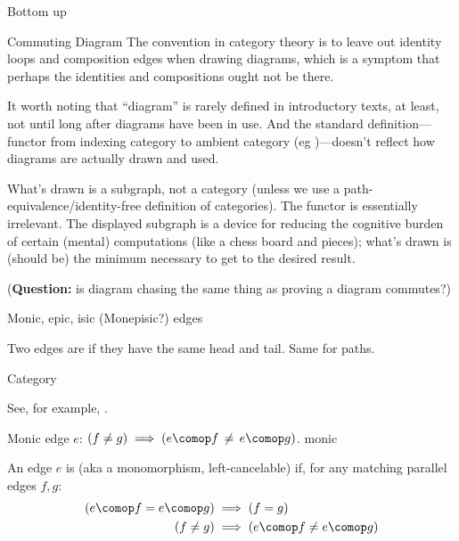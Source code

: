 \begin{plSection}{Bottom up}
\begin{plSection}{Commuting Diagram}
The convention in category theory is to leave out identity loops
and composition edges when drawing diagrams,
which is a symptom that perhaps the identities and compositions
ought not be there.

It worth noting that ``diagram'' is rarely defined in introductory
texts, at least, 
not until long after diagrams have been in use.
And the standard definition---functor from indexing category
to ambient category
(eg \cite[][Definition 1.6.4]{Riehl:2017:CatTheory})---doesn't reflect how
diagrams are actually drawn and used.

What's drawn is a subgraph, not a category (unless we use
a path-equivalence/identity-free definition of categories).
The functor is essentially irrelevant.
The displayed subgraph is a device for 
reducing the cognitive burden of certain (mental) computations
(like a chess board and pieces);
what's drawn is (should be) the minimum necessary 
to get to the desired result.~\cite{DutilhNovaes:2012:FormalLanguages}

(\textbf{Question:} is diagram chasing the same thing as proving
a diagram commutes?)
\end{plSection}

\begin{plSection}{Monic, epic, isic (Monepisic?) edges}
\label{sec:monic_epic_isic}

Two edges are  
if they have the same head and tail.
Same for paths.

\begin{plSection}{Category}

See, for example, \cite{Perrone:2019:CatTheory}.

\begin{plDiagram}
{Monic edge $e$: 
$\left( f \neq g \right) 
\implies 
\left( e \comop f \, \neq \, e \comop g \right)$.}
{monic}
\centering
{}
\end{plDiagram}

An edge $e$ is  (aka a monomorphism, left-cancelable)
if, for any matching parallel edges $f,g$:
\begin{align*}
\left( e \comop f = e \comop g \right) 
& 
\implies 
\left( f = g \right) 
\\
\left( f \neq g \right) 
&
\implies 
\left( e \comop f \neq e \comop g \right) 
\end{align*}


\end{plSection}
\end{plSection}
\end{plSection}
